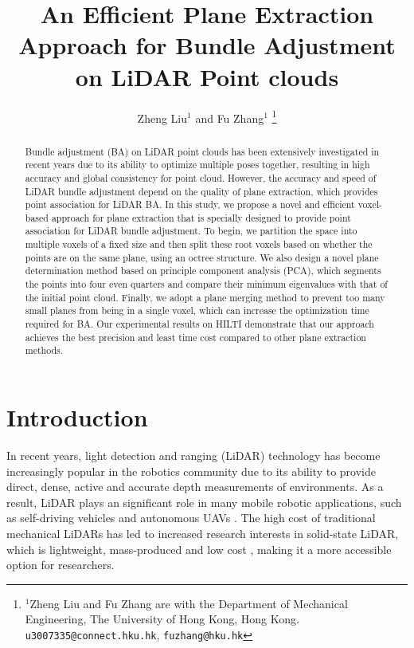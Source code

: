 \documentclass[letterpaper, 10 pt, conference]{ieeeconf}  %
\title{\LARGE \bf An Efficient Plane Extraction Approach for Bundle Adjustment on LiDAR Point clouds}
\author{Zheng Liu$^{1}$ and Fu Zhang$^{1}$%
\thanks{$^{1}$Zheng Liu and Fu Zhang are with the Department of Mechanical Engineering, The University of Hong Kong, Hong Kong.
        {\tt\small u3007335@connect.hku.hk}, {\tt\small fuzhang@hku.hk}}
}
\begin{document}
\maketitle
\thispagestyle{empty}
\pagestyle{empty}

\begin{abstract}


Bundle adjustment (BA) on LiDAR point clouds has been extensively investigated in recent years due to its ability to optimize multiple poses together, resulting in high accuracy and global consistency for point cloud. However, the accuracy and speed of LiDAR bundle adjustment depend on the quality of plane extraction, which provides point association for LiDAR BA. In this study, we propose a novel and efficient voxel-based approach for plane extraction that is specially designed to provide point association for LiDAR bundle adjustment. To begin, we partition the space into multiple voxels of a fixed size and then split these root voxels based on whether the points are on the same plane, using an octree structure. We also design a novel plane determination method based on principle component analysis (PCA), which segments the points into four even quarters and compare their minimum eigenvalues with that of the initial point cloud. Finally, we adopt a plane merging method to prevent too many small planes from being in a single voxel, which can increase the optimization time required for BA. Our experimental results on HILTI demonstrate that our approach achieves the best precision and least time cost compared to other plane extraction methods.

\end{abstract}

\section{Introduction}

In recent years, light detection and ranging (LiDAR) technology has become increasingly popular in the robotics community \cite{urmson2008autonomous} due to its ability to provide direct, dense, active and accurate depth measurements of environments. As a result, LiDAR plays an significant role in many mobile robotic applications, such as self-driving vehicles \cite{hecht2018lidar} and autonomous UAVs \cite{kong2021avoiding, gao2019flying}. The high cost of traditional mechanical LiDARs has led to increased  research interests in solid-state LiDAR, which is lightweight, mass-produced and low cost \cite{liu2021low, wang2020mems}, making it a more accessible option for researchers. 
\end{document}
